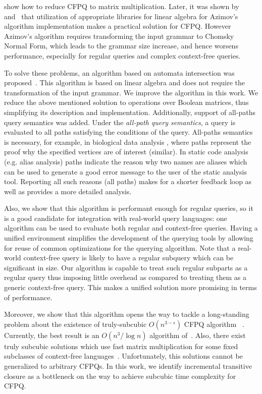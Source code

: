 \cite{Azimov:2018:CPQ:3210259.3210264} show how to reduce CFPQ to matrix multiplication.
Later, it was shown by~\cite{Mishin:2019:ECP:3327964.3328503} and~\cite{10.1145/3398682.3399163} that utilization of appropriate libraries for linear algebra for Azimov's algorithm implementation makes a practical solution for CFPQ.
However Azimov's algorithm requires transforming the input grammar to Chomsky Normal Form, which leads to the grammar size increase, and hence worsens performance, especially for regular queries and complex context-free queries.

To solve these problems, an algorithm based on automata intersection was proposed~\citep{10.1007/978-3-030-54832-2_6}.
This algorithm is based on linear algebra and does not require the transformation of the input grammar.
We improve the algorithm in this work.
We reduce the above mentioned solution to operations over Boolean matrices, thus simplifying its description and implementation. Additionally, support of all-paths query semantics was added. Under the \textit{all-path query semantics}, a query is evaluated to all paths satisfying the conditions of the query. All-paths semantics is necessary, for example, in biological data analysis \citep{GraphQueryWithEarley}, where paths represent the proof why the specified vertices are of interest (similar). In static code analysis (e.g. alias analysis) paths indicate the reason why two names are aliases which can be used to generate a good error message to the user of the static analysis tool. Reporting all such reasons (all paths) makes for a shorter feedback loop as well as provides a more detailed analysis.

Also, we show that this algorithm is performant enough for regular queries, so it is a good candidate for integration with real-world query languages: one algorithm can be used to evaluate both regular and context-free queries. Having a unified environment simplifies the development of the querying tools by allowing for reuse of common optimizations for the querying algorithm. 
Note that a real-world context-free query is likely to have a regular subquery which can be significant in size. Our algorithm is capable to treat such regular subparts as a regular query thus imposing little overhead as compared to treating them as a generic context-free query. This makes a unified solution more promising in terms of performance. 

Moreover, we show that this algorithm opens the way to tackle a long-standing problem about the existence of truly-subcubic $O(n^{3-\epsilon})$ CFPQ algorithm ~\citep{10.1145/1328438.1328460, Yannakakis}.
Currently, the best result is an $O(n^3/\log{n})$ algorithm of~\cite{10.1145/1328438.1328460}.
Also, there exist truly subcubic solutions which use fast matrix multiplication for some fixed subclasses of context-free languages~\citep{8249039}.
Unfortunately, this solutions cannot be generalized to arbitrary CFPQs.
In this work, we identify incremental transitive closure as a bottleneck on the way to achieve subcubic time complexity for CFPQ.


